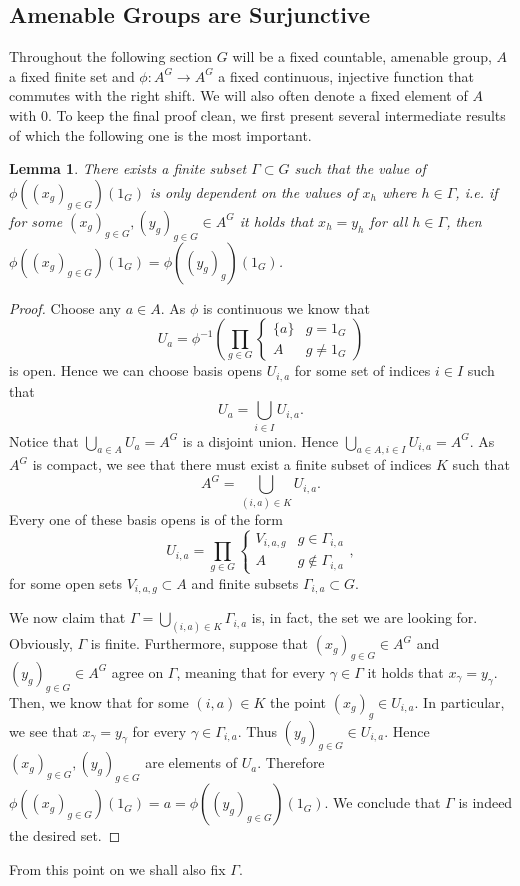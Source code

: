 \documentclass[titlepage, a4paper]{article}
\newtheorem{lemma}[theorem]{Lemma}
\theoremstyle{definition}
\theoremstyle{remark}
\begin{document}
\subsection{Amenable Groups are Surjunctive} \label{ssec:amenable_surjunctive}
Throughout the following section $G$ will be a fixed countable, amenable group, $A$ a fixed finite set and $\phi: A^{G} \to A^{G}$ a fixed continuous, injective function that commutes with the right shift. 
We will also often denote a fixed element of $A$ with $0$.
To keep the final proof clean, we first present several intermediate results of which the following one is the most important.
\begin{lemma}
	There exists a finite subset $\Gamma \subset G$ such that the value of $\phi((x_g)_{g \in G})(1_G)$ is only dependent on the values of $x_h$ where  $h \in \Gamma$, 
	i.e. if for some  $(x_g)_{g \in G}, (y_g)_{g \in G} \in A^{G}$ it holds that $x_h = y_h$ for all $h \in \Gamma$, then $\phi((x_g)_{g \in G})(1_G) = \phi((y_g)_g)(1_G)$.
\end{lemma}
\begin{proof}
	Choose any $a \in A$. As $\phi$ is continuous we know that \[
	U_a = \phi^{-1}\left( \prod_{g\in G} \begin{cases}
			\{a\} & g = 1_G\\
			A & g \ne 1_G
	\end{cases} \right)
\]
	is open. Hence we can choose basis opens $U_{i, a}$ for some set of indices $i \in I$ such that  \[
		U_a= \bigcup_{i \in I} U_{i,a}
	.\] 
	Notice that $\bigcup_{a \in A} U_a = A^{G}$ is a disjoint union. 
	Hence $\bigcup_{a \in A, i \in I} U_{i, a} = A^{G}$. 
	As $A^{G}$ is compact, we see that there must exist a finite subset of indices $K$ such that \[
		A^{G} = \bigcup_{(i, a) \in K} U_{i, a}
	.\] 
	Every one of these basis opens is of the form \[
	U_{i,a} = \prod_{g \in G} \begin{cases}
		V_{i,a,g} & g \in \Gamma_{i,a}\\
		A & g \not\in \Gamma_{i,a}
	\end{cases}
	,\]
	for some open sets $V_{i,a,g} \subset A$ and finite subsets $\Gamma_{i,a} \subset G$. 

	We now claim that $\Gamma = \bigcup_{(i,a) \in K} \Gamma_{i,a}$ is, in fact, the set we are looking for. 
	Obviously, $\Gamma$ is finite. 
	Furthermore, suppose that $(x_g)_{g\in G} \in A^{G}$ and $(y_g)_{g \in G} \in A^{G}$ agree on $\Gamma$,
	meaning that for every $\gamma \in \Gamma$ it holds that  $x_\gamma = y_\gamma$.
	Then, we know that for some  $(i, a) \in K$ the point $(x_g)_g \in U_{i,a}$. 
	In particular, we see that $x_\gamma = y_\gamma$ for every $\gamma \in \Gamma_{i,a}$. 
	Thus $(y_g)_{g \in G} \in U_{i, a}$. 
	Hence  $(x_g)_{g \in G} , (y_g)_{g \in G}$ are elements of $U_a$. 
	Therefore  $\phi((x_g)_{g \in G})(1_G) = a = \phi((y_g)_{g \in G})(1_G) $.
	We conclude that $\Gamma$ is indeed the desired set.
\end{proof}
From this point on we shall also fix $\Gamma$. 
\end{document}
